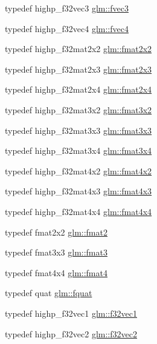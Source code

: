 \begin{DoxyCompactItemize}
typedef highp\+\_\+f32vec3 \hyperlink{group__gtc__type__precision_ga33b85a14a8f68ec99029ff13db6af369}{glm\+::fvec3}
\item 
typedef highp\+\_\+f32vec4 \hyperlink{group__gtc__type__precision_ga55d1365630d3b3ecf7c7f4e7c29a9cb1}{glm\+::fvec4}
\item 
typedef highp\+\_\+f32mat2x2 \hyperlink{group__gtc__type__precision_gada7823c23ae249dccaecb5a016c667f4}{glm\+::fmat2x2}
\item 
typedef highp\+\_\+f32mat2x3 \hyperlink{group__gtc__type__precision_ga087d875cd4e384f101a28a4caf8ccd94}{glm\+::fmat2x3}
\item 
typedef highp\+\_\+f32mat2x4 \hyperlink{group__gtc__type__precision_gaf3af7a2f10aaf8028a95b7232b24d84e}{glm\+::fmat2x4}
\item 
typedef highp\+\_\+f32mat3x2 \hyperlink{group__gtc__type__precision_ga723b6e3dd4ff1c0d76d3c9f72ea0d9a7}{glm\+::fmat3x2}
\item 
typedef highp\+\_\+f32mat3x3 \hyperlink{group__gtc__type__precision_gafa6841eaaa5ee45de1d892c26b349571}{glm\+::fmat3x3}
\item 
typedef highp\+\_\+f32mat3x4 \hyperlink{group__gtc__type__precision_ga87084a1f4d6e8dd94f719029840dbafc}{glm\+::fmat3x4}
\item 
typedef highp\+\_\+f32mat4x2 \hyperlink{group__gtc__type__precision_ga0cf4b66f4929b3c21ab7b967386fc7dd}{glm\+::fmat4x2}
\item 
typedef highp\+\_\+f32mat4x3 \hyperlink{group__gtc__type__precision_ga5af77d2574bca528d321fbf261c90107}{glm\+::fmat4x3}
\item 
typedef highp\+\_\+f32mat4x4 \hyperlink{group__gtc__type__precision_gaa641dae0fcc277f028b4e48e16bbea86}{glm\+::fmat4x4}
\item 
typedef fmat2x2 \hyperlink{group__gtc__type__precision_ga96b15c5eaecce87b352dab5d373da979}{glm\+::fmat2}
\item 
typedef fmat3x3 \hyperlink{group__gtc__type__precision_gaa7b09502b183884aca53338c35b09509}{glm\+::fmat3}
\item 
typedef fmat4x4 \hyperlink{group__gtc__type__precision_gafbea1649c5384f13ff4595c9d0003a68}{glm\+::fmat4}
\item 
typedef quat \hyperlink{group__gtc__type__precision_gaa95d73f08018f3864c6ae08dbf1c59f2}{glm\+::fquat}
\item 
typedef highp\+\_\+f32vec1 \hyperlink{group__gtc__type__precision_ga7335bddf7a09ba275d5d04f7681f03e6}{glm\+::f32vec1}
\item 
typedef highp\+\_\+f32vec2 \hyperlink{group__gtc__type__precision_ga0eba48c6b8abbee31dbf5655dd171ead}{glm\+::f32vec2}

\end{DoxyCompactItemize}
